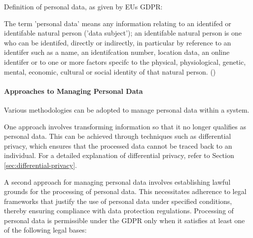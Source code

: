 Definition of personal data, as given by EUs GDPR:

\begin{myquote}
    The term 'personal data' means any information relating to an identifed or identifable natural person ('data subject'); an identifable natural person is one who can be identifed, directly or indirectly, in particular by reference to an identifer such as a name, an identifcation number, location data, an online identifer or to one or more factors specifc to the physical, physiological, genetic, mental, economic, cultural or social identity of that natural person. (\cite{in2023gdpr_website})
\end{myquote}

\paragraph{Approaches to Managing Personal Data}
Various methodologies can be adopted to manage personal data within a system. 

One approach involves transforming information so that it no longer qualifies as personal data. This can be achieved through techniques such as differential privacy, which ensures that the processed data cannot be traced back to an individual. For a detailed explanation of differential privacy, refer to Section \ref{sec:differential-privacy}. 

A second approach for managing personal data involves establishing lawful grounds for the processing of personal data. This necessitates adherence to legal frameworks that justify the use of personal data under specified conditions, thereby ensuring compliance with data protection regulations. Processing of personal data is permissible under the GDPR only when it satisfies at least one of the following legal bases:

